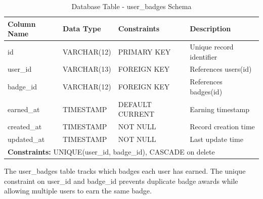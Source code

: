 \documentclass[12pt,a4paper]{report}
\newcommand{\JustifiedNormal}{\fontsize{12}{14}\selectfont\justifying\setlength{\parindent}{0pt}}
\begin{document}
\begin{table}[H]
\centering
\caption{Database Table - user\_badges Schema}
\small
\begin{tabular}{|p{3.5cm}|p{3cm}|p{3cm}|p{4cm}|}
\hline
\textbf{Column Name} & \textbf{Data Type} & \textbf{Constraints} & \textbf{Description} \\
\hline
id & VARCHAR(12) & PRIMARY KEY & Unique record identifier \\
\hline
user\_id & VARCHAR(13) & FOREIGN KEY & References users(id) \\
\hline
badge\_id & VARCHAR(12) & FOREIGN KEY & References badges(id) \\
\hline
earned\_at & TIMESTAMP & DEFAULT CURRENT & Earning timestamp \\
\hline
created\_at & TIMESTAMP & NOT NULL & Record creation time \\
\hline
updated\_at & TIMESTAMP & NOT NULL & Last update time \\
\hline
\multicolumn{4}{|l|}{\textbf{Constraints:} UNIQUE(user\_id, badge\_id), CASCADE on delete} \\
\hline
\end{tabular}
\end{table}

\JustifiedNormal
The user\_badges table tracks which badges each user has earned. The unique constraint on user\_id and badge\_id prevents duplicate badge awards while allowing multiple users to earn the same badge.
\end{document}
